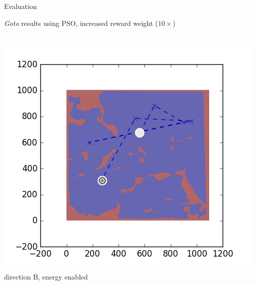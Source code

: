 \documentclass[9pt]{beamer}
\begin{document}
\begin{frame}{Evaluation}
\begin{block}{\textit{Goto} results using PSO, increased reward weight ($10\times$)}
\begin{columns}
\begin{column}{0.25\textwidth}
\begin{center}
                    \includegraphics[width=\textwidth,trim={2cm 2cm 2cm 2cm},clip]{img/EXP3RG_PathAb_-1_-1_-1_0d01.png}
                    \newline
                    \tiny{direction B, energy enabled}
                \end{center}
            \end{column}
        \end{columns}
    \end{block}
\end{frame}
\end{document}
